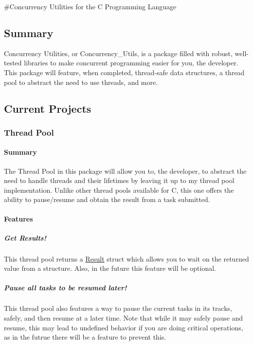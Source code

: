 \#\+Concurrency Utilities for the C Programming Language

\subsection*{Summary}

Concurrency Utilities, or Concurrency\+\_\+\+Utils, is a package filled with robust, well-\/tested libraries to make concurrent programming easier for you, the developer. This package will feature, when completed, thread-\/safe data structures, a thread pool to abstract the need to use threads, and more.

\subsection*{Current Projects}

\subsubsection*{Thread Pool}

\paragraph*{Summary}

The Thread Pool in this package will allow you to, the developer, to abstract the need to handle threads and their lifetimes by leaving it up to my thread pool implementation. Unlike other thread pools available for C, this one offers the ability to pause/resume and obtain the result from a task submitted.

\paragraph*{Features}

\subparagraph*{Get Results!}

This thread pool returns a \hyperlink{struct_result}{Result} struct which allows you to wait on the returned value from a structure. Also, in the future this feature will be optional.

\subparagraph*{Pause all tasks to be resumed later!}

This thread pool also features a way to pause the current tasks in it\textquotesingle{}s tracks, safely, and then resume at a later time. Note that while it may safely pause and resume, this may lead to undefined behavior if you are doing critical operations, as in the futrue there will be a feature to prevent this.

